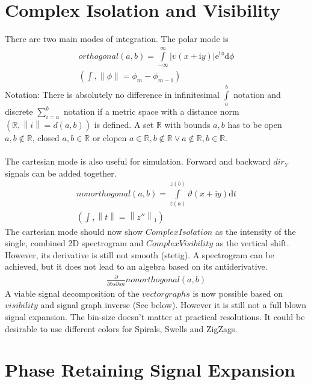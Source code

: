 \documentclass{report}
\newcommand\norm[1]{\left\lVert#1\right\rVert}
\begin{document}
\section{Complex Isolation and Visibility}
There are two main modes of integration. The polar mode is
\begin{align}
orthogonal(a,b)=\int \limits _{-\infty}^{\infty} \lvert \upsilon (x+\mathrm{i}y)\rvert \mathrm{e}^{\mathrm{i}\phi} \mathrm{d}\phi\\
(\int,\norm{\phi}= \phi_{m}-\phi_{m-1})
\end{align}
Notation: There is absolutely no difference in infinitesimal $\int \limits _{a}^{b}$ notation and discrete $\sum  \limits _{i=a}^{b}$ notation if a metric space with a distance norm $(\mathbb{R},\norm{i}=d(a,b))$ is defined. A set $\mathbb{R}$ with bounds $a,b$ has to be open $a,b \not \in \mathbb{R}$, closed $a,b \in \mathbb{R}$ or clopen $a \in \mathbb{R}, b \not \in \mathbb{R} \lor a \not \in \mathbb{R},b \in \mathbb{R}$.\\\\
The cartesian mode is also useful for simulation. Forward and backward $dir_{Y}$ signals can be added together.
\begin{align}
nonorthogonal(a,b)=\int \limits _{z(a)}^{z(b)} \vartheta (x+\mathrm{i}y) \mathrm{d} t\\
(\int,\norm{t}=\norm{z''}_1)
\end{align}
The cartesian mode should now show $Complex Isolation$ as the intensity of the single, combined 2D spectrogram and $Complex Visibility$ as the vertical shift. However, its derivative is still not smooth (stetig). A spectrogram can be achieved, but it does not lead to an algebra based on its antiderivative.
\begin{align}
\frac{\partial}{\partial bs\partial sn} nonorthogonal(a,b)\label{eq:3}
\end{align}
A viable signal decomposition of the $vectorgraphs$ is now possible based on $visibility$ and signal graph inverse (See below). However it is still not a full blown signal expansion. The bin-size doesn't matter at practical resolutions. It could be desirable to use different colors for Spirals, Swells and ZigZags.

\section{Phase Retaining Signal Expansion}
\end{document}
